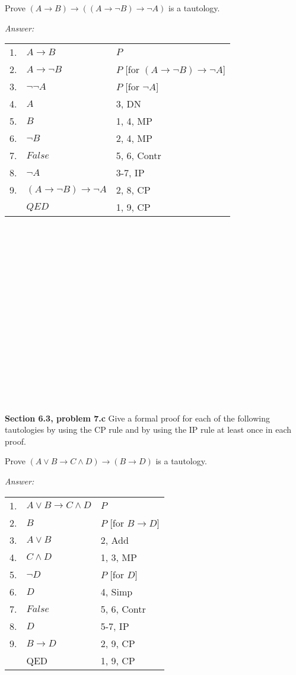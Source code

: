 \documentclass[12pt]{article}
\begin{document}
Prove $(A \rightarrow B) \rightarrow ((A \rightarrow \neg B) \rightarrow \neg A)$ is a tautology.


\emph{Answer:} 

\begin{tabular}{p{.8cm}p{8.5cm}l}
1. & $A \rightarrow B$ & $P$ \\
2. & \qquad $A \rightarrow \neg B$ & $P$ [for $(A \rightarrow \neg B) \rightarrow \neg A$] \\
3. & \qquad \qquad $\neg \neg A$ & $P$ [for $\neg A$] \\
4. & \qquad \qquad $A$ & 3, DN \\
5. & \qquad \qquad $B$ & 1, 4, MP \\
6. & \qquad \qquad $\neg B$ & 2, 4, MP \\
7. & \qquad \qquad $False$ & 5, 6, Contr  \\
8. & \qquad $\neg A$ & 3-7, IP \\
9. & $(A \rightarrow \neg B) \rightarrow \neg A$ & 2, 8, CP \\
& $QED$ & 1, 9, CP \\
\end{tabular}
\\
\\
\\
\\
\\
\\
\\
\\
\\
\\
\\
\\
\\
\\
\\
\\
\textbf{Section 6.3, problem 7.c}  Give a formal proof for each of the
following tautologies by using the CP rule and by using the IP rule at
least once in each proof.

Prove $ (A \lor B \rightarrow C \land D) \rightarrow (B \rightarrow D) $ is a tautology.


\emph{Answer:} 

\begin{tabular}{p{.8cm}p{8.5cm}l}
1. & $A \lor B \rightarrow C \land D$ & $P$ \\
2. & \qquad $B$ & $P$ [for $B \rightarrow D$] \\
3. & \qquad $A \lor B$ & 2, Add \\
4. & \qquad $C \land D$ & 1, 3, MP \\
5. & \qquad \qquad $\neg D$ & $P$ [for $D$] \\
6. & \qquad \qquad $D$ & 4, Simp \\
7. & \qquad \qquad $False$ & 5, 6, Contr \\
8. & \qquad $D$ & 5-7, IP \\
9. & $B \rightarrow D$ & 2, 9, CP \\
& QED & 1, 9, CP \\

\end{tabular}
\end{document}
